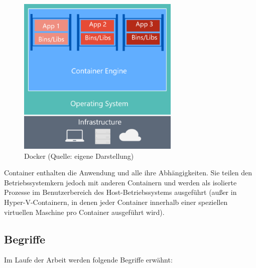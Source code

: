 \begin{figure}[H]
    \begin{center}
        \includegraphics[scale=0.8]{images/docker.png}
        \caption{Docker (Quelle: eigene Darstellung)}
    \end{center}
\end{figure}

Container enthalten die Anwendung und alle ihre Abhängigkeiten. Sie teilen den Betriebssystemkern jedoch mit anderen Containern und werden als isolierte Prozesse im Benutzerbereich des Host-Betriebssystems ausgeführt (außer in Hyper-V-Containern, in denen jeder Container innerhalb einer speziellen virtuellen Maschine pro Container ausgeführt wird). \cite{docker}

\subsection{Begriffe}\label{docker-terminology}

Im Laufe der Arbeit werden folgende Begriffe erwähnt:

